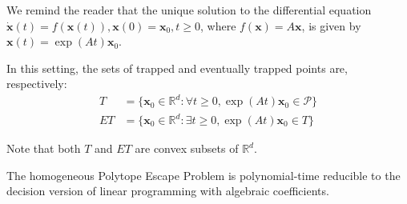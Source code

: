 We remind the reader that the unique solution to the differential equation $\dot{\boldsymbol{x}}(t)=f(\boldsymbol{x}(t)),\boldsymbol{x}(0)=\boldsymbol{x}_{0},t\geq 0$, where $f(\boldsymbol{x})=A\boldsymbol{x}$, is given by
$\boldsymbol{x}(t)=\exp(At)\boldsymbol{x}_{0}$.

In this setting, the sets of trapped and eventually trapped points are, respectively:
\begin{align*}
\mathit{T}&=\lbrace \boldsymbol{x}_0\in\mathbb{R}^{d}: \forall t\geq 0, \exp(At)\boldsymbol{x}_{0} \in \mathcal{P}\rbrace \\
\mathit{ET}&=\lbrace\boldsymbol{x}_{0}\in\mathbb{R}^{d}:\exists t\geq 0,\exp(At)\boldsymbol{x}_{0}\in\mathit{T}\rbrace
\end{align*}

Note that both $\mathit{T}$ and $\mathit{ET}$ are convex subsets of $\mathbb{R}^d$.

\begin{lemma}
  The homogeneous Polytope Escape Problem is polynomial-time
  reducible to the decision version of linear programming with
  algebraic coefficients.
\end{lemma}

